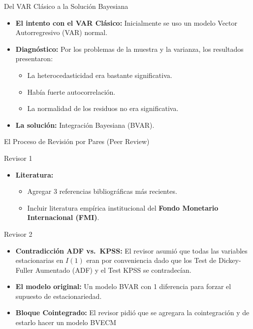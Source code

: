 \documentclass[
  10pt,
  ignorenonframetext,
  aspectratio=169,
  spanish,
]{beamer}
\providecommand{\tightlist}{%
  \setlength{\itemsep}{0pt}\setlength{\parskip}{0pt}}
\begin{document}
\begin{frame}{Del VAR Clásico a la Solución Bayesiana}
\protect{}\label{del-var-cluxe1sico-a-la-soluciuxf3n-bayesiana}
\begin{itemize}
\tightlist
\item
  \textbf{El intento con el VAR Clásico:} Inicialmente se uso un modelo
  Vector Autorregresivo (VAR) normal.
\item
  \textbf{Diagnóstico:} Por los problemas de la muestra y la varianza,
  los resultados presentaron:

  \begin{itemize}
  \tightlist
  \item
    La heterocedasticidad era bastante significativa.
  \item
    Había fuerte autocorrelación.
  \item
    La normalidad de los residuos no era significativa.
  \end{itemize}
\item
  \textbf{La solución:} Integración Bayesiana (BVAR).
\end{itemize}
\end{frame}

\begin{frame}{El Proceso de Revisión por Pares (Peer Review)}
\protect{}\label{el-proceso-de-revisiuxf3n-por-pares-peer-review}
\begin{block}{Revisor 1}
\protect{}\label{revisor-1}
\begin{itemize}
\tightlist
\item
  \textbf{Literatura:}

  \begin{itemize}
  \tightlist
  \item
    Agregar 3 referencias bibliográficas más recientes.
  \item
    Incluir literatura empírica institucional del \textbf{Fondo
    Monetario Internacional (FMI)}.
  \end{itemize}
\end{itemize}
\end{block}

\begin{block}{Revisor 2}
\protect{}\label{revisor-2}
\begin{itemize}
\tightlist
\item
  \textbf{Contradicción ADF vs.~KPSS:} El revisor asumió que todas las
  variables estacionarias en \(I(1)\) eran por conveniencia dado que los
  Test de Dickey-Fuller Aumentado (ADF) y el Test KPSS se contradecían.
\end{itemize}

\begin{itemize}
\tightlist
\item
  \textbf{El modelo original:} Un modelo BVAR con 1 diferencia para
  forzar el supuesto de estacionariedad.
\item
  \textbf{Bloque Cointegrado:} El revisor pidió que se agregara la
  cointegración y de estarlo hacer un modelo BVECM
\end{itemize}
\end{block}
\end{frame}
\end{document}
